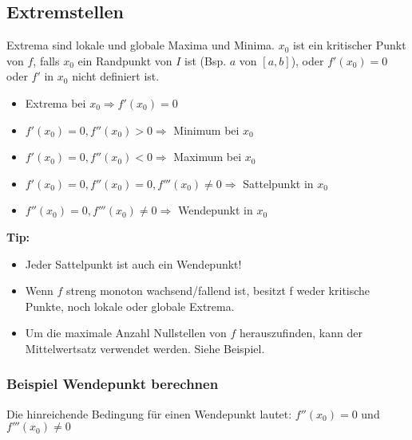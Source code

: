 

\subsection{Extremstellen}
Extrema sind lokale und globale Maxima und Minima. $x_0$ ist ein kritischer Punkt von $f$, falls $x_0$ ein Randpunkt von $I$ ist (Bsp. $a$ von $[a, b]$), oder $f'(x_0) = 0$ oder $f'$ in $x_0$ nicht definiert ist.
\begin{itemize}
	\item Extrema bei $x_0 \Rightarrow f'(x_0) = 0$
	\item $f'(x_0) = 0, f''(x_0) > 0 \Rightarrow$ Minimum bei $x_0$
	\item $f'(x_0) = 0, f''(x_0) < 0 \Rightarrow$ Maximum bei $x_0$
	\item $f'(x_0) = 0, f''(x_0) = 0, f'''(x_0) \neq 0 \Rightarrow$ Sattelpunkt in $x_0$
	\item \hspace{1.6cm} $f''(x_0) = 0, f'''(x_0) \neq 0 \Rightarrow$ Wendepunkt in $x_0$
\end{itemize}
\textbf{Tip:}
\begin{itemize}
	\item Jeder Sattelpunkt ist auch ein Wendepunkt!
	\item Wenn $f$ streng monoton wachsend/fallend ist, besitzt f weder kritische Punkte, noch lokale oder globale Extrema.
	\item Um die maximale Anzahl Nullstellen von $f$ herauszufinden, kann der Mittelwertsatz verwendet werden. Siehe Beispiel.
\end{itemize}


\subsubsection{Beispiel Wendepunkt berechnen}
Die hinreichende Bedingung für einen Wendepunkt lautet: $f''(x_0) = 0$ und $f'''(x_0) \not= 0$\\
 
